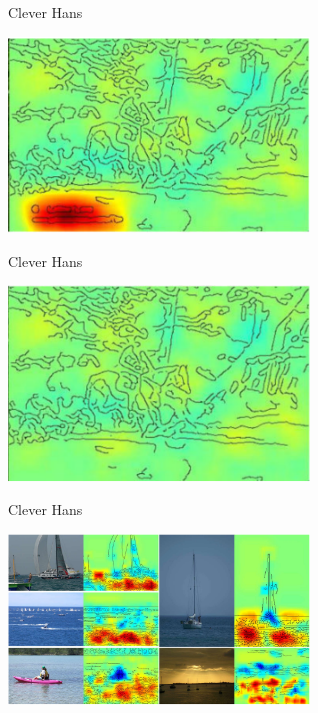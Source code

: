 \documentclass[aspectratio=169]{../latex_main/tntbeamer}  %
\begin{document}
\begin{frame}[c]{Clever Hans }
	
	\centering
	\includegraphics[width=0.6\textwidth]{01_introduction/figure/horse_map_with_label.PNG}
	
\end{frame}

\begin{frame}[c]{Clever Hans }
	
	\centering
	\includegraphics[width=0.6\textwidth]{01_introduction/figure/horse_map_without_label.PNG}
	
\end{frame}

\begin{frame}[c]{Clever Hans }
	
	\centering
	\includegraphics[width=0.6\textwidth]{01_introduction/figure/boats_maps.PNG}
	
\end{frame}
\end{document}
